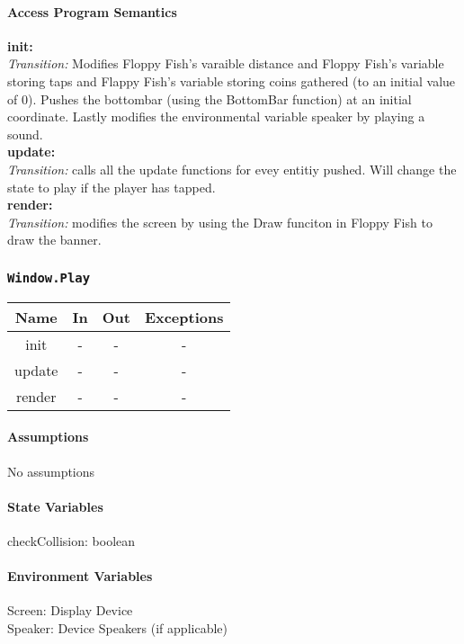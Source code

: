 \documentclass[11pt, oneside]{article}   	%
\begin{document}
\paragraph{Access Program Semantics} 
 \textbf{init:}  \\
 \textit{Transition:} Modifies Floppy Fish's varaible distance and Floppy Fish's variable storing taps and Flappy Fish's variable storing coins gathered (to an initial value of 0). Pushes the bottombar (using the BottomBar function) at an initial coordinate. Lastly modifies the environmental variable speaker by playing a sound.\\
 \textbf{update:}  \\
 \textit{Transition:} calls all the update functions for evey entitiy pushed. Will change the state to play if the player has tapped.\\
 \textbf{render:}  \\
 \textit{Transition:} modifies the screen by using the Draw funciton in Floppy Fish to draw the banner.\\


\subsubsection{\texttt{Window.Play}}



\begin{center}
\begin{tabular}{ |c|c|c|c| } 
 \hline
 Name & In & Out & Exceptions \\ 
 \hline \hline
 init & - & - & - \\ 
 update & - & - & - \\ 
 render & - & - & - \\ 

 \hline
\end{tabular}
\end{center}

\paragraph{Assumptions}
No assumptions

\paragraph{State Variables}
checkCollision: boolean\\



\paragraph{Environment Variables}
Screen: Display Device\\
Speaker: Device Speakers (if applicable)\\
\end{document}
